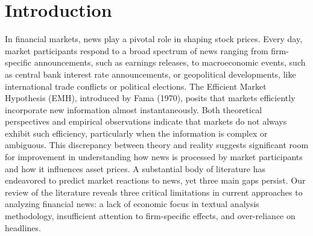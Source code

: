 \section{Introduction}
In financial markets, news play a pivotal role in shaping stock prices. Every day, market participants respond to a broad spectrum of news ranging from firm-specific announcements, such as earnings releases, to macroeconomic events, such as central bank interest rate announcements, or geopolitical developments, like international trade conflicts or political elections. The Efficient Market Hypothesis (EMH), introduced by 
\cite{fama1970efficient} Fama (1970), 
posits that markets efficiently incorporate new information almost instantaneously. Both theoretical perspectives and empirical observations indicate that markets do not always exhibit such efficiency, particularly when the information is complex or ambiguous. This discrepancy between theory and reality suggests significant room for improvement in understanding how news is processed by market participants and how it influences asset prices.
%
A substantial body of literature has endeavored to predict market reactions to news, yet three main gaps persist. Our review of the literature reveals three critical limitations in current approaches to analyzing financial news: a lack of economic focus in textual analysis methodology, insufficient attention to firm-specific effects, and over-reliance on headlines.


